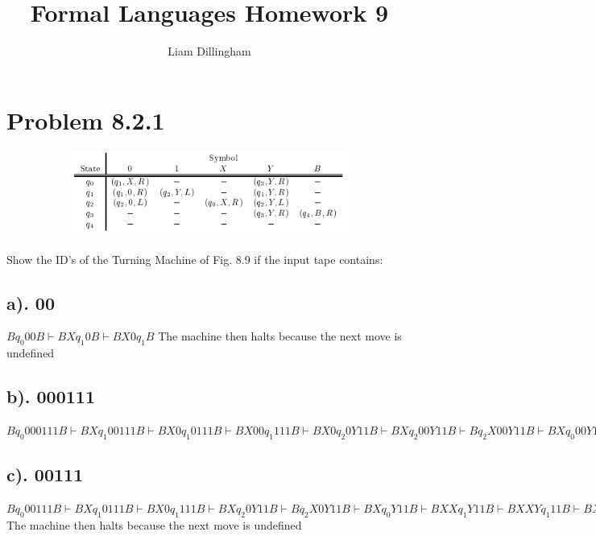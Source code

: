 \documentclass[20pt]{article} %
\title{Formal Languages Homework 9}
\author{Liam Dillingham}
\begin{document}
\maketitle

\section{Problem 8.2.1}
\begin{figure}[!htbp]
  	\centering
   	\begin{subfigure}[p]{0.7\linewidth}
    	\includegraphics[width=\linewidth]{./figures/HW9fig1.png}
   	\end{subfigure}
\end{figure} 
Show the ID's of the Turning Machine of Fig. 8.9 if the input tape contains:
\subsection{a). 00}
$B q_0 0 0 B \vdash B X q_1 0 B \vdash B X 0 q_1 B$
The machine then halts because the next move is undefined
\subsection{b). 000111}
$B q_0 0 0 0 1 1 1 B \vdash B X q_1 0 0 1 1 1 B \vdash B X 0 q_1 0 1 1 1 B \vdash B X 0 0 q_1 1 1 1 B \vdash B X 0 q_2 0 Y 1 1 B \vdash B X q_2 0 0 Y 1 1 B \vdash B q_2 X 0 0 Y 1 1 B 
\vdash B X q_0 0 0 Y 1 1 B \vdash B X X q_1 0 Y 1 1 B \vdash B X X 0 q_1 Y 1 1 B \vdash B X X 0 Y q_1 1 1 B \vdash B X X 0 q_2 Y Y 1 B \vdash B X X q_2 0 Y Y 1 B \vdash B X q_2 X 0 Y Y 1 B 
\vdash B X X q_0 0 Y Y 1 B \vdash  B X X X q_1 Y Y 1 B \vdash B X X X Y q_1 Y 1 B \vdash B X X X Y Y q_1 1 B \vdash B X X X Y q_2 Y Y B \vdash B X X X q_2 Y Y Y B 
\vdash B X X q_2 X Y Y Y B \vdash B X X X q_0 Y Y Y B \vdash B X X X Y q_3 Y Y B \vdash B X X X Y Y q_3 Y B \vdash B X X X Y Y Y q_3 B \vdash B X X X Y Y Y B q_4 B$
\subsection{c). 00111}
$B q_0 0 0 1 1 1 B \vdash B X q_1 0 1 1 1 B \vdash B X 0 q_1 1 1 1 B \vdash B X q_2 0 Y 1 1 B \vdash B q_2 X 0 Y 1 1 B \vdash B X q_0 Y 1 1 B \vdash B X X q_1 Y 1 1 B \vdash B X X Y q_1 1 1 B \vdash B X X q_2 Y Y 1 B \vdash B X q_2 X Y Y 1 B \vdash B X X q_0 Y Y 1 B \vdash B X X Y q_3 Y 1 B \vdash B X X Y Y q_3 1 B$\\
The machine then halts because the next move is undefined
\newpage
\end{document}
